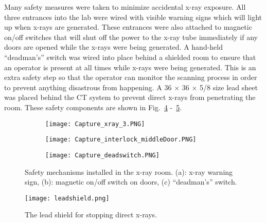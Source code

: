 Many safety measures were taken to minimize accidental x-ray exposure.  All three entrances into the lab were wired with visible warning signs which will light up when x-rays are generated.  These entrances were also attached to magnetic on/off switches that will shut off the power to the x-ray tube immediately if any doors are opened while the x-rays were being generated.  A hand-held ``deadman's'' switch was wired into place behind a shielded room to ensure that an operator is present at all times while x-rays were being generated.  This is an extra safety step so that the operator can monitor the scanning process in order to prevent anything disastrous from happening.  A 36 \inches $\times$ 36 \inches $\times$ 5/8 \inches size lead sheet was placed behind the CT system to prevent direct x-rays from penetrating the room.  These safety components are shown in Fig.~\ref{fig:safetycomponents} -~\ref{fig:leadshield}.
%
\begin{figure}[h]
	\begin{subfigure}[b]{0.3\linewidth}
	\texttt{[image: Capture\_xray\_3.PNG]}
	\caption{}
	\label{fig:xraywarningsign}
	\end{subfigure}
\hspace{0.2cm}
	\begin{subfigure}[b]{0.3\linewidth}
	\texttt{[image: Capture\_interlock\_middleDoor.PNG]}
	\caption{}
	\label{fig:doorinterlock}
	\end{subfigure}	
\hspace{0.2cm}	
	\begin{subfigure}[b]{0.3\linewidth}
	\texttt{[image: Capture\_deadswitch.PNG]}
	\caption{}
	\label{fig:deadmanswitch}
	\end{subfigure}
\caption{Safety mechanisms installed in the x-ray room. (a): x-ray warning sign, (b): magnetic on/off switch on doors, (c) ``deadman's'' switch.}
\label{fig:safetycomponents}
\end{figure}
%
\begin{figure}[h]
\centering
\texttt{[image: leadshield.png]}	
\caption{The lead shield for stopping direct x-rays.}
\label{fig:leadshield}
\end{figure}

